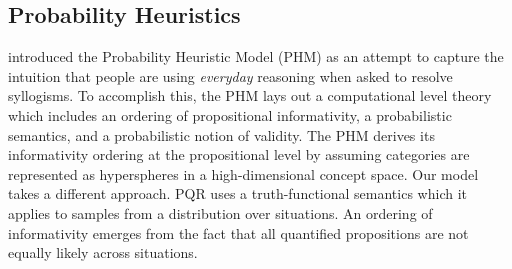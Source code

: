 \documentclass[10pt,letterpaper]{article}
\begin{document}

%

\subsection{Probability Heuristics}

 introduced the Probability Heuristic Model (PHM) as an attempt to capture the intuition that people are using \emph{everyday} reasoning when asked to resolve syllogisms. To accomplish this, the PHM lays out a computational level theory which includes an ordering of propositional informativity, a probabilistic semantics, and a probabilistic notion of validity. The PHM derives its informativity ordering at the propositional level by assuming categories are represented as hyperspheres in a high-dimensional concept space. Our model takes a different approach. PQR uses a truth-functional semantics which it applies to samples from a distribution over situations. An ordering of informativity emerges from the fact that all quantified propositions are not equally likely across situations.
\end{document}
